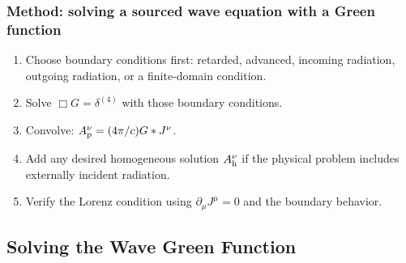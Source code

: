 
\subsubsection*{Method: solving a sourced wave equation with a Green function}
\begin{enumerate}
  \item Choose boundary conditions first: retarded, advanced, incoming radiation, outgoing radiation, or a finite-domain condition.
  \item Solve $\Box G=\delta^{(4)}$ with those boundary conditions.
  \item Convolve: $A^\nu_{\rm p}=(4\pi/c)G*J^\nu$.
  \item Add any desired homogeneous solution $A^\nu_{\rm h}$ if the physical problem includes externally incident radiation.
  \item Verify the Lorenz condition using $\partial_\mu J^\mu=0$ and the boundary behavior.
\end{enumerate}

\subsection{Solving the Wave Green Function}\label{subsec:lec20-solving-green}

